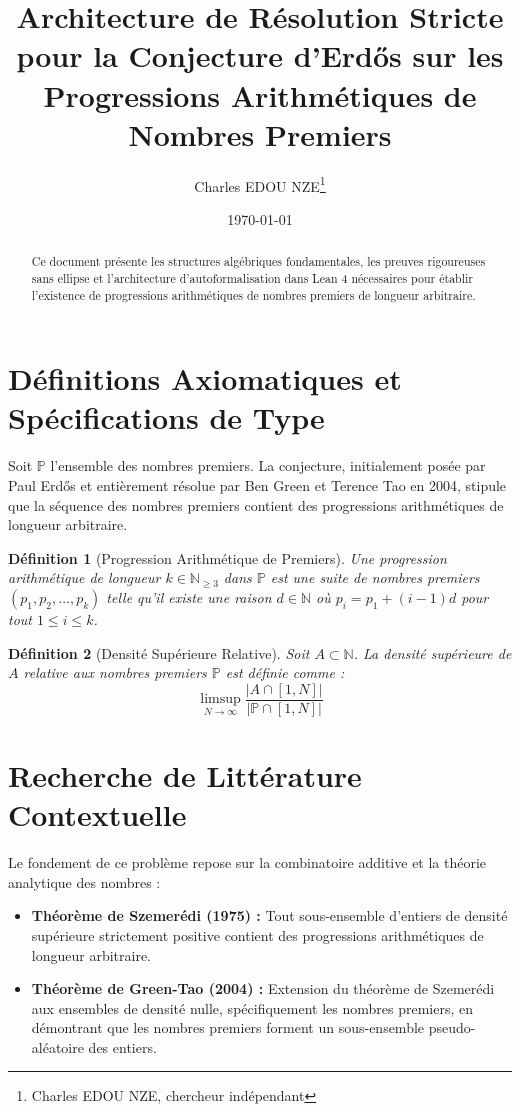 \documentclass[12pt,a4paper]{article}
\title{Architecture de R\'esolution Stricte pour la Conjecture d'Erd\H{o}s sur les Progressions Arithm\'etiques de Nombres Premiers}
\author{Charles EDOU NZE\thanks{Charles EDOU NZE, chercheur ind\'ependant}}
\date{\today}
\newtheorem{definition}{D\'efinition}
\begin{document}
\maketitle

\begin{abstract}
Ce document pr\'esente les structures alg\'ebriques fondamentales, les preuves rigoureuses sans ellipse et l'architecture d'autoformalisation dans Lean 4 n\'ecessaires pour \'etablir l'existence de progressions arithm\'etiques de nombres premiers de longueur arbitraire.
\end{abstract}

\tableofcontents
\newpage

\section{D\'efinitions Axiomatiques et Sp\'ecifications de Type}

Soit $\mathbb{P}$ l'ensemble des nombres premiers. La conjecture, initialement pos\'ee par Paul Erd\H{o}s et enti\`erement r\'esolue par Ben Green et Terence Tao en 2004, stipule que la s\'equence des nombres premiers contient des progressions arithm\'etiques de longueur arbitraire.

\begin{definition}[Progression Arithm\'etique de Premiers]
Une progression arithm\'etique de longueur $k \in \mathbb{N}_{\geq 3}$ dans $\mathbb{P}$ est une suite de nombres premiers $(p_1, p_2, \ldots, p_k)$ telle qu'il existe une raison $d \in \mathbb{N}$ o\`u $p_i = p_1 + (i-1)d$ pour tout $1 \leq i \leq k$.
\end{definition}

\begin{definition}[Densit\'e Sup\'erieure Relative]
Soit $A \subset \mathbb{N}$. La densit\'e sup\'erieure de $A$ relative aux nombres premiers $\mathbb{P}$ est d\'efinie comme :
$$ \limsup_{N \to \infty} \frac{|A \cap [1, N]|}{|\mathbb{P} \cap [1, N]|} $$
\end{definition}

\section{Recherche de Litt\'erature Contextuelle}

Le fondement de ce probl\`eme repose sur la combinatoire additive et la th\'eorie analytique des nombres :
\begin{itemize}
    \item \textbf{Th\'eor\`eme de Szemer\'edi (1975) :} Tout sous-ensemble d'entiers de densit\'e sup\'erieure strictement positive contient des progressions arithm\'etiques de longueur arbitraire.
    \item \textbf{Th\'eor\`eme de Green-Tao (2004) :} Extension du th\'eor\`eme de Szemer\'edi aux ensembles de densit\'e nulle, sp\'ecifiquement les nombres premiers, en d\'emontrant que les nombres premiers forment un sous-ensemble pseudo-al\'eatoire des entiers.
\end{itemize}
\end{document}
